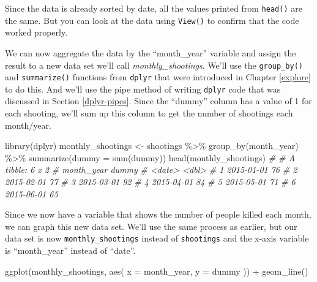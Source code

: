 \documentclass[
]{krantz}
\makeatletter
\newenvironment{Shaded}{\begin{snugshade}}{\end{snugshade}}
\newcommand{\AttributeTok}[1]{\textcolor[rgb]{0.61,0.61,0.61}{#1}}
\newcommand{\CommentTok}[1]{\textcolor[rgb]{0.37,0.37,0.37}{\textit{#1}}}
\newcommand{\FunctionTok}[1]{\textcolor[rgb]{0,0,0}{#1}}
\newcommand{\NormalTok}[1]{#1}
\newcommand{\OtherTok}[1]{\textcolor[rgb]{0.37,0.37,0.37}{#1}}
\newcommand{\SpecialCharTok}[1]{\textcolor[rgb]{0,0,0}{#1}}
\newenvironment{kframe}{%
\medskip{}
\setlength{\fboxsep}{.8em}
 \def\at@end@of@kframe{}%
 \ifinner\ifhmode%
  \def\at@end@of@kframe{\end{minipage}}%
  \begin{minipage}{\columnwidth}%
 \fi\fi%
 \def\FrameCommand##1{\hskip\@totalleftmargin \hskip-\fboxsep
 \colorbox{shadecolor}{##1}\hskip-\fboxsep
     \hskip-\linewidth \hskip-\@totalleftmargin \hskip\columnwidth}%
 \MakeFramed {\advance\hsize-\width
   \@totalleftmargin\z@ \linewidth\hsize
   \@setminipage}}%
 {\par\unskip\endMakeFramed%
 \at@end@of@kframe}
\renewenvironment{Shaded}{\begin{kframe}}{\end{kframe}}
\makeatother
\begin{document}
Since the data is already sorted by date, all the values
printed from \texttt{head()} are the same. But you can look
at the data using \texttt{View()} to confirm that the code
worked properly.

We can now aggregate the data by the ``month\_year''
variable and assign the result to a new data set we'll call
\emph{monthly\_shootings}. We'll use the
\texttt{group\_by()} and \texttt{summarize()} functions from
\texttt{dplyr} that were introduced in Chapter \ref{explore}
to do this. And we'll use the pipe method of writing
\texttt{dplyr} code that was discussed in Section
\ref{dplyr-pipes}. Since the ``dummy'' column has a value of
1 for each shooting, we'll sum up this column to get the
number of shootings each month/year.

\begin{Shaded}
\begin{Highlighting}[]
\FunctionTok{library}\NormalTok{(dplyr)}
\NormalTok{monthly\_shootings }\OtherTok{\textless{}{-}}\NormalTok{ shootings }\SpecialCharTok{\%\textgreater{}\%}
  \FunctionTok{group\_by}\NormalTok{(month\_year) }\SpecialCharTok{\%\textgreater{}\%}
  \FunctionTok{summarize}\NormalTok{(}\AttributeTok{dummy =} \FunctionTok{sum}\NormalTok{(dummy))}
\FunctionTok{head}\NormalTok{(monthly\_shootings)}
\CommentTok{\# \# A tibble: 6 x 2}
\CommentTok{\#   month\_year dummy}
\CommentTok{\#   \textless{}date\textgreater{}     \textless{}dbl\textgreater{}}
\CommentTok{\# 1 2015{-}01{-}01    76}
\CommentTok{\# 2 2015{-}02{-}01    77}
\CommentTok{\# 3 2015{-}03{-}01    92}
\CommentTok{\# 4 2015{-}04{-}01    84}
\CommentTok{\# 5 2015{-}05{-}01    71}
\CommentTok{\# 6 2015{-}06{-}01    65}
\end{Highlighting}
\end{Shaded}

Since we now have a variable that shows the number of people
killed each month, we can graph this new data set. We'll use
the same process as earlier, but our data set is now
\texttt{monthly\_shootings} instead of \texttt{shootings}
and the x-axis variable is ``month\_year'' instead of
``date''.

\begin{Shaded}
\begin{Highlighting}[]
\FunctionTok{ggplot}\NormalTok{(monthly\_shootings, }\FunctionTok{aes}\NormalTok{(}
  \AttributeTok{x =}\NormalTok{ month\_year,}
  \AttributeTok{y =}\NormalTok{ dummy}
\NormalTok{)) }\SpecialCharTok{+}
  \FunctionTok{geom\_line}\NormalTok{()}
\end{Highlighting}
\end{Shaded}
\end{document}
